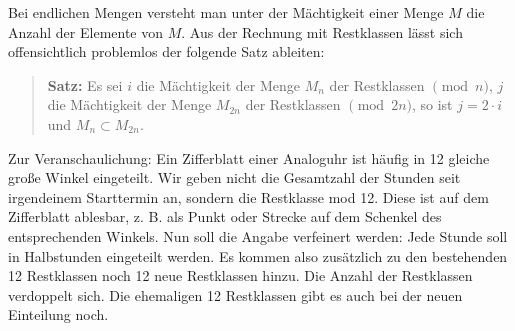 \documentclass[11pt]{article}
\begin{document}
Bei endlichen Mengen versteht man unter der Mächtigkeit einer Menge $M$ die
Anzahl der Elemente von $M$. Aus der Rechnung mit Restklassen lässt sich
offensichtlich problemlos der folgende Satz ableiten:
\begin{quote}
  \textbf{Satz:} Es sei $i$ die Mächtigkeit der Menge $M_n$ der Restklassen
  $\pmod{n}$, $j$ die Mächtigkeit der Menge $M_{2n}$ der Restklassen
  $\pmod{2n}$, so ist $j = 2 \cdot i$ und $M_n \subset M_{2n}$.
\end{quote}
Zur Veranschaulichung: Ein Zifferblatt einer Analoguhr ist häufig in 12
gleiche große Winkel eingeteilt. Wir geben nicht die Gesamtzahl der Stunden
seit irgendeinem Starttermin an, sondern die Restklasse mod 12. Diese ist auf
dem Zifferblatt ablesbar, z. B. als Punkt oder Strecke auf dem Schenkel des
entsprechenden Winkels. Nun soll die Angabe verfeinert werden: Jede Stunde
soll in Halbstunden eingeteilt werden. Es kommen also zusätzlich zu den
bestehenden 12 Restklassen noch 12 neue Restklassen hinzu. Die Anzahl der
Restklassen verdoppelt sich. Die ehemaligen 12 Restklassen gibt es auch bei
der neuen Einteilung noch.
\end{document}
